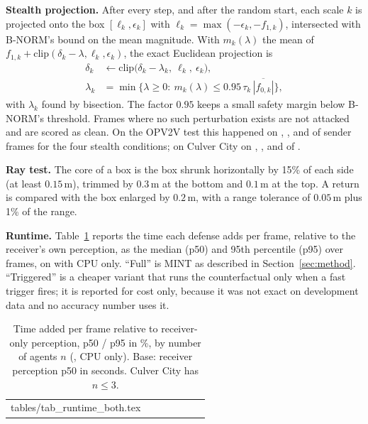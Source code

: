 \documentclass[conference]{IEEEtran}
\makeatletter
\newcommand{\mint}{MINT}
\newcommand{\tabin}[1]{\@@input #1 }
\makeatother
\begin{document}
\textbf{Stealth projection.} After every step, and after the random start, each scale $k$ is projected onto
the box $[\ell_k,\epsilon_k]$ with $\ell_k=\max(-\epsilon_k,-f_{1,k})$, intersected with B-NORM's bound on the mean
magnitude. With $m_k(\lambda)$ the mean of $f_{1,k}+\mathrm{clip}(\delta_k-\lambda,\ell_k,\epsilon_k)$, the
exact Euclidean projection is
\begin{equation}
\begin{split}
\delta_k&\leftarrow \mathrm{clip}\big(\delta_k-\lambda_k,\ \ell_k,\ \epsilon_k\big),\\
\lambda_k&=\min\big\{\lambda\ge 0:\ m_k(\lambda)\le 0.95\,\tau_k\,\overline{|f_{0,k}|}\big\},
\end{split}
\label{eq:stealth}
\end{equation}
with $\lambda_k$ found by bisection. The factor $0.95$ keeps a small safety margin below B-NORM's threshold.
Frames where no such perturbation exists are not attacked and are scored as clean. On the OPV2V test this
happened on \InfeasiblePgdUntSt, \InfeasiblePgdRemSt, \InfeasiblePgdUntStStrong{} and
\InfeasiblePgdRemStStrong{} of \WithSenderPgdRemSt{} sender frames for the four stealth conditions; on Culver
City on \CulInfeasiblePgdUntSt, \CulInfeasiblePgdRemSt, \CulInfeasiblePgdUntStStrong{} and
\CulInfeasiblePgdRemStStrong{} of \CulWithSender.

\textbf{Ray test.} The core of a box is the box shrunk horizontally by 15\% of each side (at least $0.15$\,m),
trimmed by $0.3$\,m at the bottom and $0.1$\,m at the top. A return is compared with the box enlarged by
$0.2$\,m, with a range tolerance of $0.05$\,m plus 1\% of the range.

\textbf{Runtime.} Table~\ref{tab:runtime} reports the time each defense adds per frame, relative to the
receiver's own perception, as the median (p50) and 95th percentile (p95) over frames, on \TimingMachine{} with
CPU only. ``Full'' is \mint{} as described in Section~\ref{sec:method}. ``Triggered'' is a cheaper variant that
runs the counterfactual only when a fast trigger fires; it is reported for cost only, because it was not exact on
development data and no accuracy number uses it.

\begin{table}[!htb]
\caption{Time added per frame relative to receiver-only perception, p50 / p95 in \%, by number of agents $n$
(\TimingMachine, CPU only). Base: receiver perception p50 in seconds. Culver City has $n\le 3$.}
\label{tab:runtime}
\centering
\footnotesize
\setlength{\tabcolsep}{4pt}
\begin{tabular}{@{}llrcccc@{}}
\toprule
\tabin{tables/tab_runtime_both.tex}
\bottomrule
\end{tabular}
\end{table}
\FloatBarrier
\end{document}
